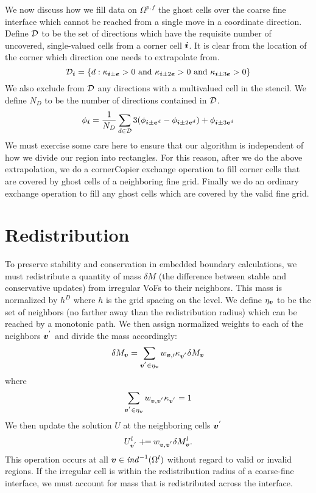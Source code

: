 We now discuss how we fill data on $\Omega^{p,f}$ the ghost cells over
the coarse fine interface which cannot be reached from a single move
in a coordinate direction.   Define  ${\cal D}$
to be the set of directions which have the requisite number of
uncovered, single-valued cells from a corner cell ${\boldsymbol{i}}$.
It is clear from the location of the corner which direction
one needs to extrapolate from.
$$
{\cal D}_{\boldsymbol{i}} = \{ d : \kappa_{{\boldsymbol{i}} \pm {\boldsymbol{e}}} > 0 \mbox{ and }
\kappa_{{\boldsymbol{i}} \pm 2{\boldsymbol{e}}} > 0\mbox{ and } \kappa_{{\boldsymbol{i}} \pm 3{\boldsymbol{e}}} > 0 \}
$$
We also exclude from ${\cal D}$ any directions with a multivalued cell
in the stencil.  We define
$N_D$ to be the number of directions contained in ${\cal D}$.   
$$
\phi_{{\boldsymbol{i}}} = \frac{1}{N_D} \sum\limits_{d \in {\cal D}}
3(\phi_{{\boldsymbol{i}} \pm {\boldsymbol{e}}^d} - \phi_{{\boldsymbol{i}} \pm 2{\boldsymbol{e}}^d}) +
\phi_{{\boldsymbol{i}} \pm 3{\boldsymbol{e}}^d} 
$$
We must exercise some care here to ensure
that our algorithm is independent of how we divide our region into
rectangles.    For this reason, after we do the above extrapolation,
we do a cornerCopier exchange operation to fill corner cells that
are covered by ghost cells of a neighboring fine grid.   Finally we do
an ordinary exchange operation to fill any ghost cells which are
covered by the valid fine grid.


\section{Redistribution}
\label{sec::levelredist}

To preserve stability and conservation in embedded boundary
calculations, we must redistribute a quantity of mass $\delta M$
(the difference between stable and conservative updates)
from irregular VoFs to their neighbors.  This mass is normalized
by $h^D$ where $h$ is the grid spacing on the level.  We define 
${\eta}_{{\boldsymbol{v}}}$ to be the set of neighbors (no farther away
than the redistribution radius) which can be reached by 
a monotonic path.  We then assign normalized weights to each of the
neighbors ${{\boldsymbol{v}^{'}}}$ and divide the mass accordingly:
\begin{equation}
\delta M_{{\boldsymbol{v}}} = \sum\limits_{{\boldsymbol{v}^{'}} \in {\eta}_{{\boldsymbol{v}}}} w_{{\boldsymbol{v}}, \prime}
        \kappa_{{\boldsymbol{v}^{'}}} \delta M_{{\boldsymbol{v}}}
\end{equation}
where 
\begin{equation}
\sum\limits_{{\boldsymbol{v}^{'}} \in {\eta}_{{\boldsymbol{v}}}} w_{{\boldsymbol{v}}, {\boldsymbol{v}^{'}}} \kappa_{{\boldsymbol{v}^{'}}} = 1
\end{equation}
We then update the solution $U$ at the neighboring cells ${{\boldsymbol{v}^{'}}}$
\begin{equation}
U^l_{{\boldsymbol{v}^{'}}} \mathbin{+\mkern-7mu=}  w_{{\boldsymbol{v}},{\boldsymbol{v}^{'}}} \delta M^l_{{\boldsymbol{v}}}.
\label{eqn::levelredist}
\end{equation}
This operation occurs at all ${\boldsymbol{v}} \in {\it ind}^{-1}(\Omega^l)$
without regard to valid or invalid regions.
If the irregular cell is within the redistribution radius of
a coarse-fine interface, we must account for mass that 
is redistributed across the interface.  

